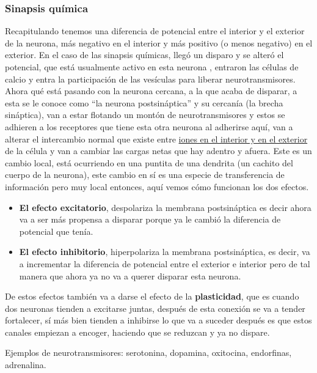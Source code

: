 \subsubsection{Sinapsis química}
Recapitulando tenemos una diferencia de potencial entre el interior y el exterior de la neurona, más negativo en el interior y más positivo (o menos negativo) en el exterior.
En el caso de las sinapsis químicas, llegó un disparo y se alteró el potencial, que está usualmente activo en esta neurona , entraron las
células de calcio y entra la participación de las vesículas para liberar neurotransmisores. Ahora qué está pasando con la neurona cercana, a la que acaba de disparar, a esta se le conoce como “la neurona postsináptica” y su cercanía (la brecha sináptica), van a estar flotando un montón de
neurotransmisores y estos se adhieren a los receptores que tiene esta otra neurona al adherirse aquí, van a alterar el intercambio normal que existe entre \underline{iones en el interior y en el exterior} de la célula y van a cambiar las cargas netas que hay adentro y afuera. Este es un cambio local, está ocurriendo en una puntita de una dendrita (un cachito del cuerpo de la neurona), este cambio en sí es una especie de transferencia de información pero muy local entonces,  aquí vemos cómo funcionan los dos efectos. 

\begin{itemize}
\item \textbf{El efecto excitatorio}, despolariza la membrana postsináptica es decir ahora va a ser más propensa a disparar porque ya le cambió la diferencia de potencial que tenía.  
\item \textbf{El efecto inhibitorio}, hiperpolariza la membrana postsináptica, es decir, va a incrementar la diferencia de potencial entre el exterior e interior pero de tal manera que ahora ya no va a querer disparar esta neurona.
\end{itemize}

De estos efectos también va a darse el efecto de la \textbf{plasticidad}, que es cuando dos neuronas tienden a excitarse juntas, después de esta conexión se va a tender fortalecer, sí más bien tienden a inhibirse lo que va a suceder después es que estos canales empiezan a encoger, haciendo que se reduzcan y ya no dispare.

Ejemplos de neurotransmisores: serotonina, dopamina, oxitocina, endorfinas, adrenalina.


